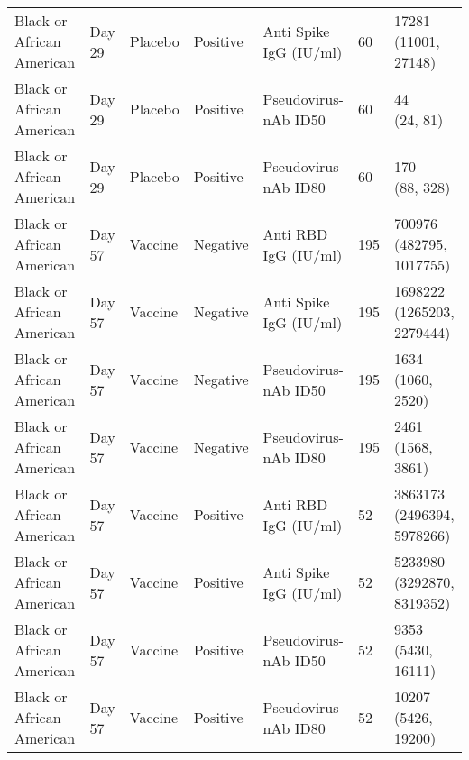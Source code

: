 \documentclass[]{book}
\theoremstyle{definition}
\theoremstyle{definition}
\theoremstyle{definition}
\newcommand{\1}{\mathbbm{1}}
\begin{document}
\begin{landscape}
\begin{ThreePartTable}
\begin{longtable}[t]{>{\raggedright\arraybackslash}p{7cm}llllll}
\hspace{1em}Black or African American & Day 29 & Placebo & Positive & Anti Spike IgG (IU/ml) & 60 & \makecell[l]{17281\\(11001, 27148)}\\
\hspace{1em}Black or African American & Day 29 & Placebo & Positive & Pseudovirus-nAb ID50 & 60 & \makecell[l]{44\\(24, 81)}\\
\hspace{1em}Black or African American & Day 29 & Placebo & Positive & Pseudovirus-nAb ID80 & 60 & \makecell[l]{170\\(88, 328)}\\
\hspace{1em}Black or African American & Day 57 & Vaccine & Negative & Anti RBD IgG (IU/ml) & 195 & \makecell[l]{700976\\(482795, 1017755)}\\
\hspace{1em}Black or African American & Day 57 & Vaccine & Negative & Anti Spike IgG (IU/ml) & 195 & \makecell[l]{1698222\\(1265203, 2279444)}\\
\hspace{1em}Black or African American & Day 57 & Vaccine & Negative & Pseudovirus-nAb ID50 & 195 & \makecell[l]{1634\\(1060, 2520)}\\
\hspace{1em}Black or African American & Day 57 & Vaccine & Negative & Pseudovirus-nAb ID80 & 195 & \makecell[l]{2461\\(1568, 3861)}\\
\hspace{1em}Black or African American & Day 57 & Vaccine & Positive & Anti RBD IgG (IU/ml) & 52 & \makecell[l]{3863173\\(2496394, 5978266)}\\
\hspace{1em}Black or African American & Day 57 & Vaccine & Positive & Anti Spike IgG (IU/ml) & 52 & \makecell[l]{5233980\\(3292870, 8319352)}\\
\hspace{1em}Black or African American & Day 57 & Vaccine & Positive & Pseudovirus-nAb ID50 & 52 & \makecell[l]{9353\\(5430, 16111)}\\
\hspace{1em}Black or African American & Day 57 & Vaccine & Positive & Pseudovirus-nAb ID80 & 52 & \makecell[l]{10207\\(5426, 19200)}\\

\end{longtable}
\end{ThreePartTable}
\end{landscape}
\end{document}
